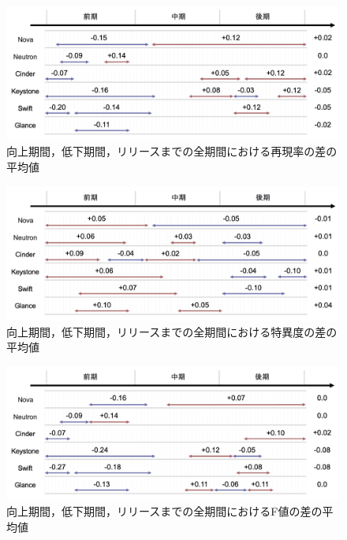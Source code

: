 \documentclass[submit]{ipsj}
\begin{document}
\begin{figure}[t]
\begin{center}
    \includegraphics[width=1.0\textwidth]{Uenaka_fig/RQ2_result/merge_R.pdf}
    \caption{向上期間，低下期間，リリースまでの全期間における再現率の差の平均値}
    \label{fig:merge_prepare_R}
\end{center}
\end{figure}

\begin{figure}[t]
\begin{center}
    \includegraphics[width=1.0\textwidth]{Uenaka_fig/RQ2_result/merge_S.pdf}
    \caption{向上期間，低下期間，リリースまでの全期間における特異度の差の平均値}
    \label{fig:merge_prepare_S}
\end{center}
\end{figure}

\begin{figure}[t]
\begin{center}
    \includegraphics[width=1.0\textwidth]{Uenaka_fig/RQ2_result/merge_F.pdf}
    \caption{向上期間，低下期間，リリースまでの全期間におけるF値の差の平均値}
    \label{fig:merge_prepare_F}
\end{center}
\end{figure}
\end{document}
